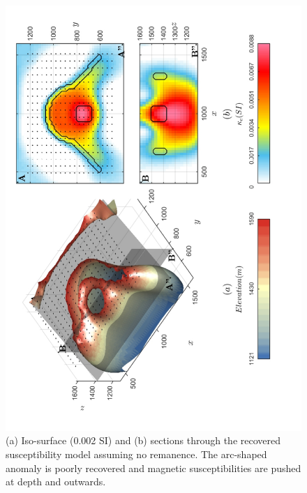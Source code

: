 \begin{figure}[h!]
\centering
\includegraphics[scale=0.52, angle =270]{3D_Inv_l2l2_model_REMANENT.pdf}
\caption{ (a) Iso-surface (0.002 SI) and (b) sections through the recovered susceptibility model assuming no remanence. The arc-shaped anomaly is poorly recovered and magnetic susceptibilities are pushed at depth and outwards.}
\label{fig:3D_Inv_l2l2_model_REMANENT}
\end{figure}

